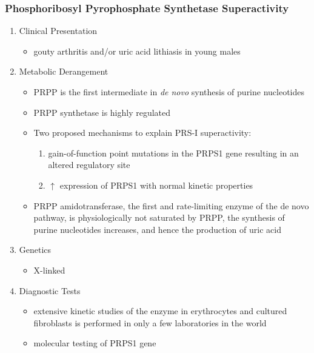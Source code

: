 \documentclass{scrartcl}
\begin{document}
\subsubsection{Phosphoribosyl Pyrophosphate Synthetase Superactivity}
\label{sec:orga8a5b62}
\begin{enumerate}
\item Clinical Presentation
\label{sec:org8fafca8}
\begin{itemize}
\item gouty arthritis and/or uric acid lithiasis in young males
\end{itemize}

\item Metabolic Derangement
\label{sec:orgd977eee}

\begin{itemize}
\item PRPP is the first intermediate in \emph{de novo} synthesis of purine nucleotides
\item PRPP synthetase is highly regulated
\item Two proposed mechanisms to explain PRS-I superactivity:
\begin{enumerate}
\item gain-of-function point mutations in the PRPS1 gene resulting in an
altered regulatory site
\item \(\uparrow\) expression of PRPS1 with normal kinetic properties
\end{enumerate}
\item PRPP amidotransferase, the first and rate-limiting enzyme
of the de novo pathway, is physiologically not saturated by PRPP,
the synthesis of purine nucleotides increases, and hence the
production of uric acid
\end{itemize}

\item Genetics
\label{sec:org0d739bd}
\begin{itemize}
\item X-linked
\end{itemize}

\item Diagnostic Tests
\label{sec:orgde1a8c0}
\begin{itemize}
\item extensive kinetic studies of the enzyme in erythrocytes and cultured
fibroblasts is performed in only a few laboratories in the world
\item molecular testing of PRPS1 gene
\end{itemize}


\end{enumerate}
\end{document}
